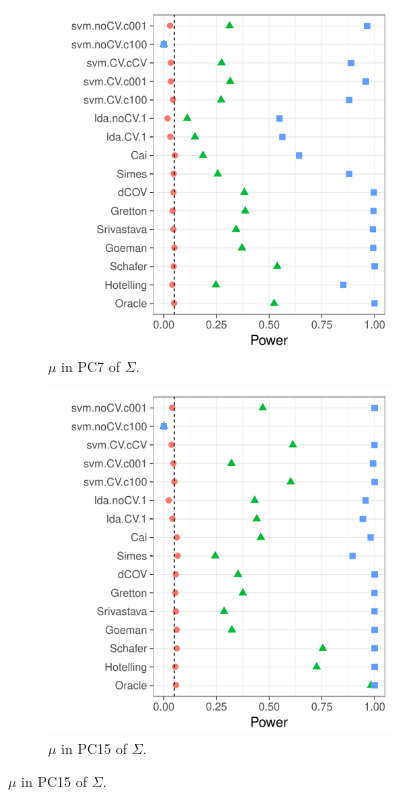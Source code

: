 \documentclass[onecolumn,draftclsnofoot]{IEEEtran}
\begin{document}
\begin{figure}[h]
	\centering
	\caption{Short memory, AR(1) correlation. $\Vert \mu \Vert_2$ fixed. }	
	\label{fig:dependence_4}	
	\begin{subfigure}[t]{.45\columnwidth}
		\centering
		\includegraphics[width=1\columnwidth]{"art/file32"}
		\caption{$\mu$ in PC7 of $\Sigma$.}  
		\label{fig:dependence_41}	
	\end{subfigure}
	\begin{subfigure}[t]{0.45\columnwidth}
		\centering
		\includegraphics[width=1\columnwidth]{"art/file31"}
		\caption{$\mu$ in PC15 of $\Sigma$.}  
		\label{fig:dependence_42}	
	\end{subfigure}
	
\end{figure}
\end{document}

